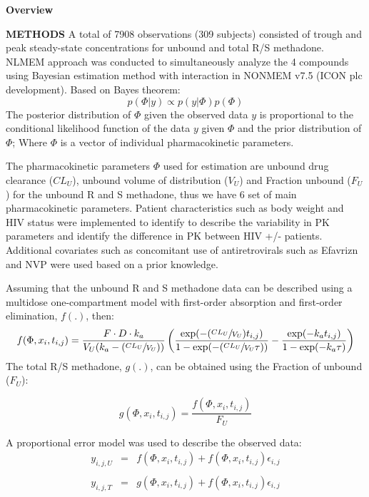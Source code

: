 \documentclass[final]{beamer}
\newlength{\colwidth}
\begin{document}
\begin{frame}[t]
\begin{columns}[t]
\begin{column}{\colwidth}
\begin{block}{\textbf{Overview}}
  \end{block}
  \begin{block}{\textbf{METHODS}} 
  A total of 7908 observations (309 subjects) consisted of trough and peak steady-state concentrations for unbound and total R/S methadone. NLMEM approach was conducted to simultaneously analyze the 4 compounds using Bayesian estimation method with interaction in NONMEM v7.5 (ICON plc development). Based on Bayes theorem:
  \begin{equation}\label{eq:1}
  p(\Phi|y) \propto p(y|\Phi) p(\Phi)
  \end{equation}
  The posterior distribution of $\Phi$ given the observed data $y$ is proportional to the conditional likelihood function of the data $y$ given $\Phi$ and the prior distribution of $\Phi$; Where $\Phi$ is a vector of individual pharmacokinetic parameters. \par
  The pharmacokinetic parameters $\Phi$ used for estimation are unbound drug clearance ($CL_U$), unbound volume of distribution ($V_U$) and Fraction unbound ($F_U$) for the unbound R and S methadone, thus we have 6 set of main pharmacokinetic parameters. Patient characteristics such as body weight and HIV status were implemented to identify to describe the variability in PK parameters and identify the difference in PK between HIV +/- patients. Additional covariates such as concomitant use of antiretrovirals such as Efavrizn and NVP were used based on a prior knowledge.  \par
Assuming that the unbound R and S methadone data can be described using a multidose one-compartment model with first-order absorption and first-order elimination, $f(.)$, then:
\begin{equation}\label{eq:2}
	f(\Phi, x_i, t_{i,j}) = \frac{F \cdot D \cdot k_a}{V_U(k_a - (\sfrac{CL_U}{V_U}))} \left(\frac{\exp(-(\sfrac{CL_U}{V_U}) t_{i,j})}{1 - \exp(-(\sfrac{CL_U}{V_U}\tau))} - \frac{\exp(-k_a t_{i,j})}{1 - \exp(-k_a\tau)}\right) 
\end{equation}
The total R/S methadone, $g(.)$, can be obtained using the Fraction of unbound ($F_U$):

\begin{equation}\label{eq:3}
	g(\Phi, x_i, t_{i,j}) = \frac{f(\Phi, x_i, t_{i,j})}{F_U}
\end{equation}

A proportional error model was used to describe the observed data:
\begin{eqnarray*}
	y_{i,j,U} &=& f(\Phi, x_i, t_{i,j}) + f(\Phi, x_i, t_{i,j})\epsilon_{i,j}\\
	~\\
	y_{i,j,T} &=& g(\Phi, x_i, t_{i,j}) + f(\Phi, x_i, t_{i,j})\epsilon_{i,j} 
\end{eqnarray*}
  \end{block}


\end{column}
\end{columns}
\end{frame}
\end{document}
